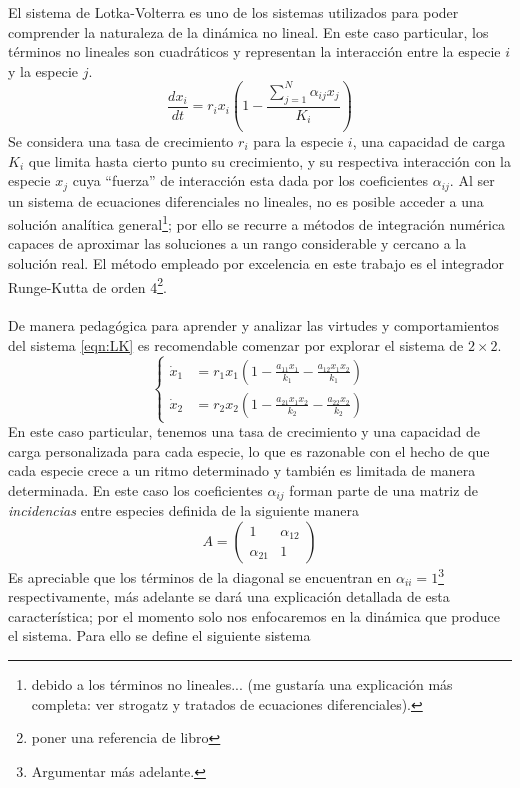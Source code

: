 \documentclass[11pt,a4paper]{article}
\begin{document}
El sistema de Lotka-Volterra es uno de los sistemas utilizados para poder comprender la naturaleza de la dinámica no lineal. En este caso particular, los términos no lineales son cuadráticos y representan la interacción entre la especie $i$ y la especie $j$. 
\begin{equation}\label{eqn:LK}
	\frac{dx_i}{dt}=r_ix_i\left(1-\frac{\sum_{j=1}^N \alpha_{ij}x_j}{K_i}\right)
\end{equation}
Se considera una tasa de crecimiento $r_i$ para la especie $i$, una capacidad de carga $K_i$ que limita hasta cierto punto su crecimiento, y su respectiva interacción con la especie $x_j$ cuya ``fuerza'' de interacción esta dada por los coeficientes $\alpha_{ij}$. Al ser un sistema de ecuaciones diferenciales no lineales, no es posible acceder a una solución analítica general\footnote{debido a los términos no lineales... (me gustaría una explicación más completa: ver strogatz y tratados de ecuaciones diferenciales).}; por ello se recurre a métodos de integración numérica capaces de aproximar las soluciones a un rango considerable y cercano a la solución real. El método empleado por excelencia en este trabajo es el integrador Runge-Kutta de orden 4\footnote{poner una referencia de libro}.\\
\\
De manera pedagógica para aprender y analizar las virtudes y comportamientos del sistema \ref{eqn:LK} es recomendable comenzar por explorar el sistema de $2\times 2$.
$$
\begin{cases}
	\dot{x}_1&=r_1x_1(1-\frac{a_{11}x_1}{k_1}-\frac{a_{12}x_1x_2}{k_1})\\
	\dot{x}_2&=r_2x_2(1-\frac{a_{21}x_1x_2}{k_2}-\frac{a_{22}x_2}{k_2})
\end{cases}
$$
En este caso particular, tenemos una tasa de crecimiento y una capacidad de carga personalizada para cada especie, lo que es razonable con el hecho de que cada especie crece a un ritmo determinado y también es limitada de manera determinada. En este caso los coeficientes $\alpha_{ij}$ forman parte de una matriz de \textit{incidencias} entre especies definida de la siguiente manera
\begin{equation}\label{eqn:mIncidencias}
	A=
	\begin{pmatrix}
		1 & \alpha_{12}\\
		\alpha_{21} &1
	\end{pmatrix}
\end{equation}
Es apreciable que los términos de la diagonal se encuentran en $\alpha_{ii} = 1$\footnote{Argumentar más adelante.} respectivamente, más adelante se dará una explicación detallada de esta característica; por el momento solo nos enfocaremos en la dinámica que produce el sistema. Para ello se define el siguiente sistema
\end{document}
